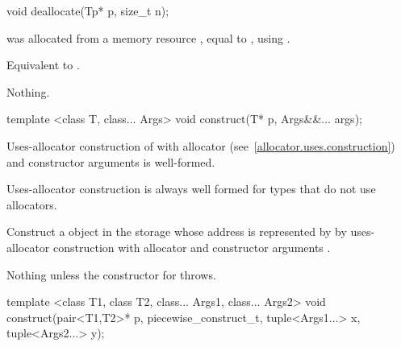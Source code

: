 %
\begin{itemdecl}
void deallocate(Tp* p, size_t n);
\end{itemdecl}

\begin{itemdescr}
\pnum
\requires
{} was allocated from a memory resource ,
equal to ,
using .

\pnum
\effects
Equivalent to .

\pnum
\throws
Nothing.
\end{itemdescr}

%
\begin{itemdecl}
template <class T, class... Args>
  void construct(T* p, Args&&... args);
\end{itemdecl}

\begin{itemdescr}
\pnum
\requires
Uses-allocator construction of 
with allocator  (see~\ref{allocator.uses.construction})
and constructor arguments  is well-formed.
\begin{note}
Uses-allocator construction is always well formed
for types that do not use allocators.\end{note}

\pnum
\effects
Construct a  object in the storage
whose address is represented by 
by uses-allocator construction with allocator 
and constructor arguments .

\pnum
\throws
Nothing unless the constructor for  throws.
\end{itemdescr}

%
\begin{itemdecl}
template <class T1, class T2, class... Args1, class... Args2>
  void construct(pair<T1,T2>* p, piecewise_construct_t,
                 tuple<Args1...> x, tuple<Args2...> y);
\end{itemdecl}

